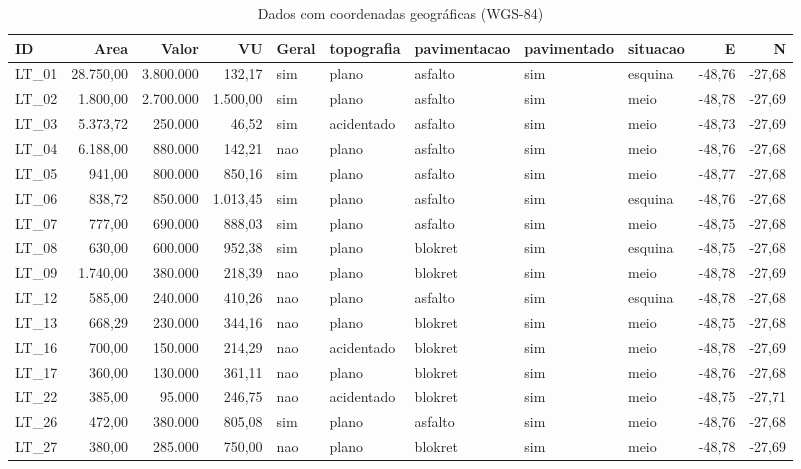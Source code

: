 \documentclass[]{article}
\begin{document}
\begin{landscape}\begin{table}

\caption{\label{tab:geo}Dados com coordenadas geográficas (WGS-84)}
\centering
\begin{tabular}[t]{lrrrlllllrr}
\toprule
ID & Area & Valor & VU & Geral & topografia & pavimentacao & pavimentado & situacao & E & N\\
\midrule
LT\_01 & 28.750,00 & 3.800.000 & 132,17 & sim & plano & asfalto & sim & esquina & -48,76 & -27,68\\
LT\_02 & 1.800,00 & 2.700.000 & 1.500,00 & sim & plano & asfalto & sim & meio & -48,78 & -27,69\\
LT\_03 & 5.373,72 & 250.000 & 46,52 & sim & acidentado & asfalto & sim & meio & -48,73 & -27,69\\
LT\_04 & 6.188,00 & 880.000 & 142,21 & nao & plano & asfalto & sim & meio & -48,76 & -27,68\\
LT\_05 & 941,00 & 800.000 & 850,16 & sim & plano & asfalto & sim & meio & -48,77 & -27,68\\
\addlinespace
LT\_06 & 838,72 & 850.000 & 1.013,45 & sim & plano & asfalto & sim & esquina & -48,76 & -27,68\\
LT\_07 & 777,00 & 690.000 & 888,03 & sim & plano & asfalto & sim & meio & -48,75 & -27,68\\
LT\_08 & 630,00 & 600.000 & 952,38 & sim & plano & blokret & sim & esquina & -48,75 & -27,68\\
LT\_09 & 1.740,00 & 380.000 & 218,39 & nao & plano & blokret & sim & meio & -48,78 & -27,69\\
LT\_12 & 585,00 & 240.000 & 410,26 & nao & plano & asfalto & sim & esquina & -48,78 & -27,68\\
\addlinespace
LT\_13 & 668,29 & 230.000 & 344,16 & nao & plano & blokret & sim & meio & -48,75 & -27,68\\
LT\_16 & 700,00 & 150.000 & 214,29 & nao & acidentado & blokret & sim & meio & -48,78 & -27,69\\
LT\_17 & 360,00 & 130.000 & 361,11 & nao & plano & blokret & sim & meio & -48,76 & -27,68\\
LT\_22 & 385,00 & 95.000 & 246,75 & nao & acidentado & blokret & sim & meio & -48,75 & -27,71\\
LT\_26 & 472,00 & 380.000 & 805,08 & sim & plano & asfalto & sim & meio & -48,76 & -27,68\\
\addlinespace
LT\_27 & 380,00 & 285.000 & 750,00 & nao & plano & blokret & sim & meio & -48,78 & -27,69\\

\end{tabular}
\end{table}
\end{landscape}
\end{document}
